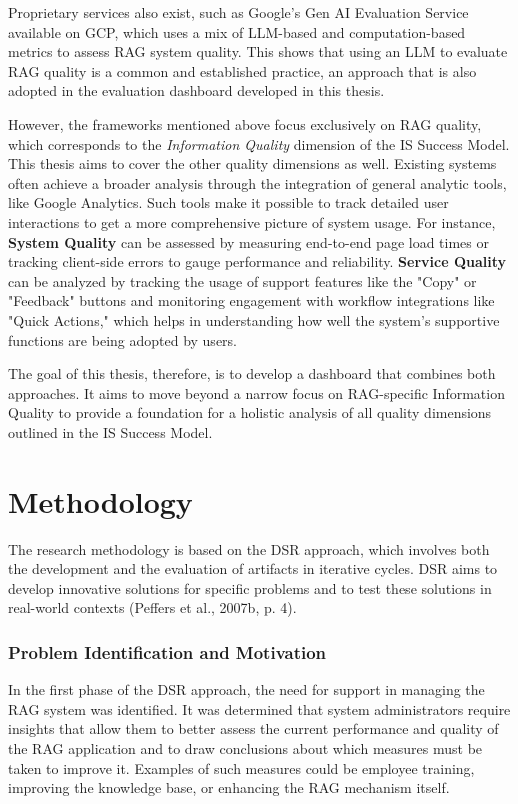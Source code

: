\documentclass[
	english,
	ruledheaders=section,%
	class=report,%
	thesis={type=bachelor},%
	accentcolor=1b,%
	custommargins=true,%
	marginpar=false,%
	parskip=half-,%
	fontsize=11pt,%
	DIV=14,
]{tudapub}
\begin{document}
Proprietary services also exist, such as Google's Gen AI Evaluation Service available on GCP, which uses a mix of LLM-based and computation-based metrics to assess RAG system quality. This shows that using an LLM to evaluate RAG quality is a common and established practice, an approach that is also adopted in the evaluation dashboard developed in this thesis.

However, the frameworks mentioned above focus exclusively on RAG quality, which corresponds to the \textit{Information Quality} dimension of the IS Success Model. This thesis aims to cover the other quality dimensions as well. Existing systems often achieve a broader analysis through the integration of general analytic tools, like Google Analytics. Such tools make it possible to track detailed user interactions to get a more comprehensive picture of system usage. For instance, \textbf{System Quality} can be assessed by measuring end-to-end page load times or tracking client-side errors to gauge performance and reliability. \textbf{Service Quality} can be analyzed by tracking the usage of support features like the "Copy" or "Feedback" buttons and monitoring engagement with workflow integrations like "Quick Actions," which helps in understanding how well the system's supportive functions are being adopted by users.

The goal of this thesis, therefore, is to develop a dashboard that combines both approaches. It aims to move beyond a narrow focus on RAG-specific Information Quality to provide a foundation for a holistic analysis of all quality dimensions outlined in the IS Success Model.
\chapter{Methodology}
The research methodology is based on the DSR approach, which involves both the development and the evaluation of artifacts in iterative cycles. DSR aims to develop innovative solutions for specific problems and to test these solutions in real-world contexts (Peffers et al., 2007b, p. 4).\\
\subsection{Problem Identification and Motivation}
In the first phase of the DSR approach, the need for support in managing the RAG system was identified. It was determined that system administrators require insights that allow them to better assess the current performance and quality of the RAG application and to draw conclusions about which measures must be taken to improve it. Examples of such measures could be employee training, improving the knowledge base, or enhancing the RAG mechanism itself.
\end{document}
